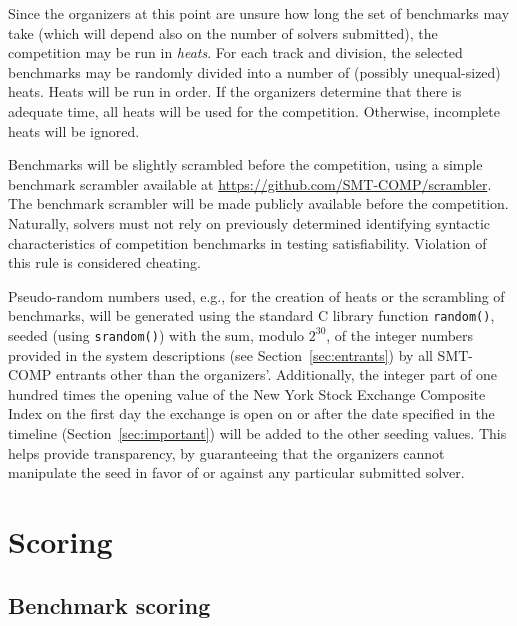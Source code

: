 \documentclass[12pt]{article}
\begin{document}
%
Since the organizers at this point are unsure how long the set of
benchmarks may take (which will depend also on the number of solvers
submitted), the competition may be run in \emph{heats}.  For each
track and division, the selected benchmarks may be randomly divided
into a number of (possibly unequal-sized) heats.  Heats will be run in
order.  If the organizers determine that there is adequate time, all
heats will be used for the competition.  Otherwise, incomplete heats
will be ignored.

%
Benchmarks will be slightly scrambled before the competition, using a simple
benchmark scrambler available at \url{https://github.com/SMT-COMP/scrambler}.
The benchmark scrambler will be made publicly available before the competition.
%
Naturally, solvers must not rely on previously determined identifying
syntactic characteristics of competition benchmarks in testing
satisfiability.  Violation of this rule is considered cheating.

%
Pseudo-random numbers used, e.g., for the creation of heats or the
scrambling of benchmarks, will be generated using the standard C
library function \texttt{random()}, seeded (using \texttt{srandom()})
with the sum, modulo $2^{30}$, of the integer numbers provided in the
system descriptions (see Section~\ref{sec:entrants}) by all SMT-COMP
entrants other than the organizers'.  Additionally, the integer part
of one hundred times the opening value of the New York Stock Exchange
Composite Index on
the first day the exchange is open on or after the date specified in
the timeline (Section~\ref{sec:important}) will be added to the other
seeding values. This helps provide transparency, by guaranteeing that
the organizers cannot manipulate the seed in favor of or against any
particular submitted solver.


\section{Scoring}
\label{sec:scoring}

\subsection{Benchmark scoring}
\label{sec:benchmark-scoring}
\end{document}
